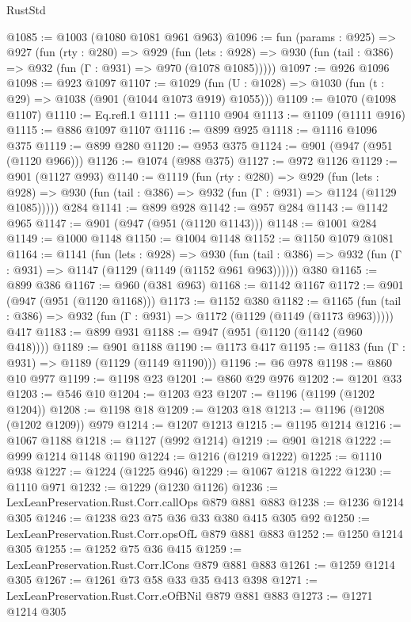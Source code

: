 \begin{lexlean}{RustStd}
\begin{coremodule}
{\begin{coremodule}
{{{{{{{{{{{{{{@1085 := @1003 (@1080 @1081 @961 @963)
@1096 := fun (params : @925) =>
  @927
    (fun (rty : @280) =>
    @929
      (fun (lets : @928) =>
      @930 (fun (tail : @386) => @932 (fun (Γ : @931) => @970 (@1078 @1085)))))
@1097 := @926 @1096
@1098 := @923 @1097
@1107 := @1029 (fun (U : @1028) => @1030 (fun (t : @29) => @1038 (@901 (@1044 @1073 @919) @1055)))
@1109 := @1070 (@1098 @1107)
@1110 := Eq.refl.{1}
@1111 := @1110 @904
@1113 := @1109 (@1111 @916)
@1115 := @886 @1097 @1107
@1116 := @899 @925
@1118 := @1116 @1096 @375
@1119 := @899 @280
@1120 := @953 @375
@1124 := @901 (@947 (@951 (@1120 @966)))
@1126 := @1074 (@988 @375)
@1127 := @972 @1126
@1129 := @901 (@1127 @993)
@1140 := @1119
    (fun (rty : @280) =>
    @929
      (fun (lets : @928) =>
      @930 (fun (tail : @386) => @932 (fun (Γ : @931) => @1124 (@1129 @1085)))))
    @284
@1141 := @899 @928
@1142 := @957 @284
@1143 := @1142 @965
@1147 := @901 (@947 (@951 (@1120 @1143)))
@1148 := @1001 @284
@1149 := @1000 @1148
@1150 := @1004 @1148
@1152 := @1150 @1079 @1081
@1164 := @1141
    (fun (lets : @928) =>
    @930 (fun (tail : @386) => @932 (fun (Γ : @931) => @1147 (@1129 (@1149 (@1152 @961 @963))))))
    @380
@1165 := @899 @386
@1167 := @960 (@381 @963)
@1168 := @1142 @1167
@1172 := @901 (@947 (@951 (@1120 @1168)))
@1173 := @1152 @380
@1182 := @1165
    (fun (tail : @386) => @932 (fun (Γ : @931) => @1172 (@1129 (@1149 (@1173 @963)))))
    @417
@1183 := @899 @931
@1188 := @947 (@951 (@1120 (@1142 (@960 @418))))
@1189 := @901 @1188
@1190 := @1173 @417
@1195 := @1183 (fun (Γ : @931) => @1189 (@1129 (@1149 @1190)))
@1196 := @6 @978
@1198 := @860 @10 @977
@1199 := @1198 @23
@1201 := @860 @29 @976
@1202 := @1201 @33
@1203 := @546 @10
@1204 := @1203 @23
@1207 := @1196 (@1199 (@1202 @1204))
@1208 := @1198 @18
@1209 := @1203 @18
@1213 := @1196 (@1208 (@1202 @1209)) @979
@1214 := @1207 @1213
@1215 := @1195 @1214
@1216 := @1067 @1188
@1218 := @1127 (@992 @1214)
@1219 := @901 @1218
@1222 := @999 @1214 @1148 @1190
@1224 := @1216 (@1219 @1222)
@1225 := @1110 @938
@1227 := @1224 (@1225 @946)
@1229 := @1067 @1218 @1222
@1230 := @1110 @971
@1232 := @1229 (@1230 @1126)
@1236 := LexLeanPreservation.Rust.Corr.callOps @879 @881 @883
@1238 := @1236 @1214 @305
@1246 := @1238 @23 @75 @36 @33 @380 @415 @305 @92
@1250 := LexLeanPreservation.Rust.Corr.opsOfL @879 @881 @883
@1252 := @1250 @1214 @305
@1255 := @1252 @75 @36 @415
@1259 := LexLeanPreservation.Rust.Corr.lCons @879 @881 @883
@1261 := @1259 @1214 @305
@1267 := @1261 @73 @58 @33 @35 @413 @398
@1271 := LexLeanPreservation.Rust.Corr.eOfBNil @879 @881 @883
@1273 := @1271 @1214 @305
}}}}}}}}}}}}}}
\end{coremodule}}
\end{coremodule}
\end{lexlean}
